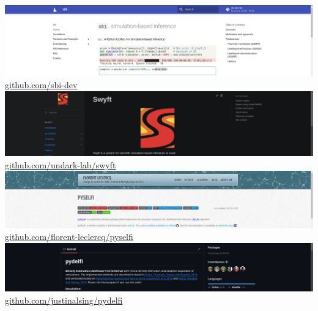 \documentclass[aspectratio=169]{beamer}
\begin{document}
\begin{frame}
\begin{columns}
        \includegraphics[width=\textwidth]{figures/sbi_screenshot}
        \href{https://github.com/sbi-dev}{github.com/sbi-dev}
        \includegraphics[width=\textwidth]{figures/swyft_screenshot}
        \href{https://github.com/undark-lab/swyft}{github.com/undark-lab/swyft}
        \includegraphics[width=\textwidth]{figures/selfi_screenshot}
        \href{https://github.com/florent-leclercq/pyselfi}{github.com/florent-leclercq/pyselfi}
        \includegraphics[width=\textwidth]{figures/delfi_screenshot}
        \href{https://github.com/justinalsing/pydelfi}{github.com/justinalsing/pydelfi}
    \end{columns}
\end{frame}
\end{document}
